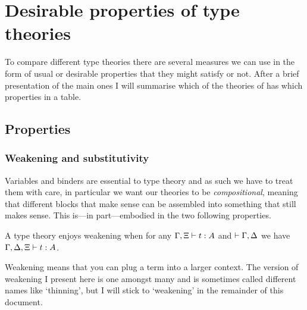 \chapter{Desirable properties of type theories}

To compare different type theories there are several measures we can use in the
form of usual or desirable properties that they might satisfy or not.
After a brief presentation of the main ones I will summarise which of the
theories of  has which properties in a table.

\section{Properties}

\subsection{Weakening and substitutivity}

Variables and binders are essential to type theory and as such we have to treat
them with care, in particular we want our theories to be \emph{compositional},
meaning that different blocks that make sense can be assembled into something
that still makes sense.
This is---in part---embodied in the two following properties.

\begin{definition}[Weakening]
  A type theory enjoys weakening when for any \(\Gamma, \Xi \vdash t : A\) and
  \(\vdash \Gamma, \Delta\) we have \(\Gamma, \Delta, \Xi \vdash t : A\).
\end{definition}

Weakening means that you can plug a term into a larger context.
The version of weakening I present here is one amongst many and is sometimes
called different names like `thinning', but I will stick to `weakening' in the
remainder of this document.

